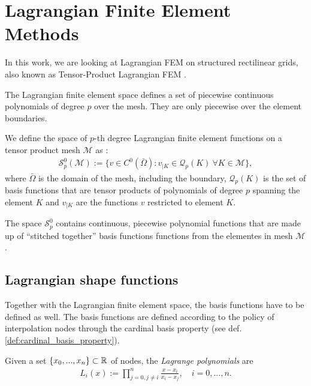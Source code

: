 \section{Lagrangian Finite Element Methods}

\label{sec:lagrange}

In this work, we are looking at Lagrangian FEM on structured rectilinear grids,
also known as Tensor-Product Lagrangian FEM \cite{hiptmair_numerical_2023}.

The Lagrangian finite element space defines a set of piecewise continuous
polynomials of degree $p$ over the mesh. They are only piecewise over the element boundaries.

\begin{definition}
    We define the space of $p$-th degree
    Lagrangian finite element functions on a tensor product mesh $\mathcal{M}$ as \cite{hiptmair_numerical_2023}:
    \begin{align}
        \mathcal{S}_p^0(\mathcal{M}) := \{ v \in C^0(\bar{\Omega}):
        v_{|K} \in \mathcal{Q}_p(K) \ \forall K \in \mathcal{M}\},
    \end{align}
    where $\bar{\Omega}$ is the domain of the mesh, including the boundary,
    $\mathcal{Q}_p(K)$ is the set of basis functions that are tensor products of polynomials of degree $p$ spanning the element $K$
    and $v_{|K}$ are the functions $v$ restricted to element $K$.

    The space $\mathcal{S}_p^0$ contains continuous, piecewise polynomial functions
    that are made up of ``stitched together'' basis functions functions from the elementes in mesh $\mathcal{M}$.
\end{definition}

\subsection{Lagrangian shape functions}

Together with the Lagrangian finite element space, the basis functions have to be defined as well.
The basis functions are defined according to the policy of interpolation nodes through the cardinal
basis property (see def. \ref{def:cardinal_basis_property}).

\begin{definition}
    Given a set $\{ x_0, ..., x_n\} \subset \mathbb{R}$ of nodes, the \emph{Lagrange polynomials} are \cite{hiptmair_numerical_2020}
    \begin{align}
        L_i(x) := \prod_{j=0, j\neq i}^n \frac{x - x_i}{x_i - x_j}, \quad i=0, ..., n.
    \end{align}
\end{definition}

